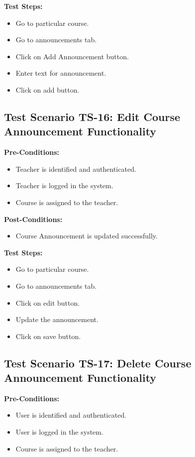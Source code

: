 \textbf{Test Steps:}
\begin{itemize}

\item Go to particular course.
\item Go to announcements tab.
\item Click on Add Announcement button.
\item Enter text for announcement.
\item Click on add button.

\end{itemize}



\subsection{Test Scenario TS-16: Edit Course Announcement Functionality}
\textbf{Pre-Conditions: }
\begin{itemize}

\item Teacher is identified and authenticated.
\item Teacher is logged in the system.
\item Course is assigned to the teacher.

\end{itemize}

\textbf{Post-Conditions: }
\begin{itemize}

\item Course Announcement is updated successfully.

\end{itemize}
\textbf{Test Steps:}
\begin{itemize}

\item Go to particular course.
\item Go to announcements tab.
\item Click on edit button.
\item Update the announcement.
\item Click on save button.

\end{itemize}


\subsection{Test Scenario TS-17: Delete Course Announcement Functionality}
\textbf{Pre-Conditions: }
\begin{itemize}

\item User is identified and authenticated.
\item User is logged in the system.
\item Course is assigned to the teacher.

\end{itemize}

